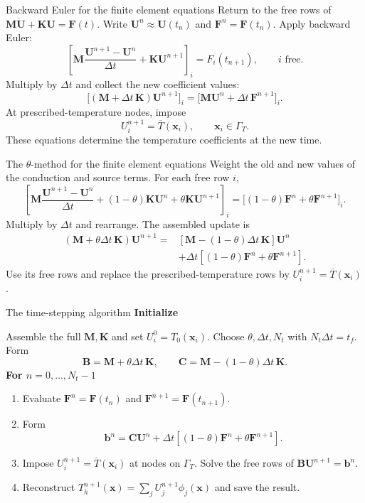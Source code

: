 \documentclass[11pt,aspectratio=169]{beamer}
\newcommand{\bU}{\bm U}
\newcommand{\bx}{\bm x}
\newcommand{\bM}{\bm M}
\newcommand{\bK}{\bm K}
\newcommand{\bF}{\bm F}
\begin{document}
\begin{frame}{Backward Euler for the finite element equations}
Return to the free rows of $\bM\dot{\bU}+\bK\bU=\bF(t)$.
Write $\bU^n\approx\bU(t_n)$ and $\bF^n=\bF(t_n)$.
Apply backward Euler:
\[
\left[\bM\frac{\bU^{n+1}-\bU^n}{\Delta t}
+\bK\bU^{n+1}\right]_i=F_i(t_{n+1}),
\qquad i\text{ free}.
\]
Multiply by $\Delta t$ and collect the new coefficient values:
\[
\boxed{
\bigl[(\bM+\Delta t\,\bK)\bU^{n+1}\bigr]_i
=\bigl[\bM\bU^n+\Delta t\,\bF^{n+1}\bigr]_i.}
\]
At prescribed-temperature nodes, impose
\[
U_i^{n+1}=\overline T(\bx_i),\qquad \bx_i\in\Gamma_T.
\]
These equations determine the temperature coefficients at the new time.
\end{frame}

\begin{frame}{The $\theta$-method for the finite element equations}
Weight the old and new values of the conduction and source terms.
For each free row $i$,
\[
\left[\bM\frac{\bU^{n+1}-\bU^n}{\Delta t}
+(1-\theta)\bK\bU^n+\theta\bK\bU^{n+1}\right]_i
=\bigl[(1-\theta)\bF^n+\theta\bF^{n+1}\bigr]_i.
\]
Multiply by $\Delta t$ and rearrange. The assembled update is
\[
\boxed{\begin{aligned}
(\bM+\theta\Delta t\,\bK)\bU^{n+1}
={}&[\bM-(1-\theta)\Delta t\,\bK]\bU^n\\
&+\Delta t[(1-\theta)\bF^n+\theta\bF^{n+1}].
\end{aligned}}
\tag{1}\label{eq:theta-update}
\]
Use its free rows and replace the prescribed-temperature rows by
$U_i^{n+1}=\overline T(\bx_i)$.
\end{frame}

\begin{frame}{The time-stepping algorithm}
\textbf{Initialize}

Assemble the full $\bM,\bK$ and set $U_i^0=T_0(\bx_i)$.
Choose $\theta,\Delta t,N_t$ with $N_t\Delta t=t_f$. Form
\[
\bm B=\bM+\theta\Delta t\,\bK,\qquad
\bm C=\bM-(1-\theta)\Delta t\,\bK.
\]
\textbf{For $n=0,\ldots,N_t-1$}
\begin{enumerate}
\item Evaluate $\bF^n=\bF(t_n)$ and $\bF^{n+1}=\bF(t_{n+1})$.
\item Form
\[
\bm b^n=\bm C\bU^n+\Delta t[(1-\theta)\bF^n+\theta\bF^{n+1}].
\]
\item Impose $U_i^{n+1}=\overline T(\bx_i)$ at nodes on $\Gamma_T$.
Solve the free rows of $\bm B\bU^{n+1}=\bm b^n$.
\item Reconstruct $T_h^{n+1}(\bx)=\sum_jU_j^{n+1}\phi_j(\bx)$ and save the result.
\end{enumerate}
\end{frame}
\end{document}
